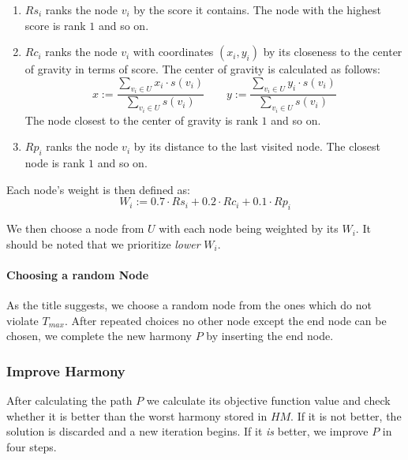 \begin{enumerate}
	\item $Rs_i$ ranks the node $v_i$ by the score it contains. The node with the highest score is rank $1$ and so on.
	\item $Rc_i$ ranks the node $v_i$ with coordinates $(x_i, y_i)$ by its closeness to the center of gravity in terms of score. The center of gravity is calculated as follows:
	      \begin{equation*}
		      x := \frac{\sum_{v_i \in U} x_i \cdot s(v_i)}{\sum_{v_i \in U} s(v_i)}\quad\quad
		      y := \frac{\sum_{v_i \in U} y_i \cdot s(v_i)}{\sum_{v_i \in U} s(v_i)}
	      \end{equation*}
	      The node closest to the center of gravity is rank $1$ and so on.
	\item $Rp_i$ ranks the node $v_i$ by its distance to the last visited node.
	      The closest node is rank $1$ and so on.
\end{enumerate}

Each node's weight is then defined as:
\begin{equation*}
  W_i := 0.7 \cdot Rs_i + 0.2 \cdot Rc_i + 0.1 \cdot Rp_i
\end{equation*}

We then choose a node from $U$ with each node being weighted by its $W_i$.
It should be noted that we prioritize \emph{lower} $W_i$.

\paragraph{Choosing a random Node}

As the title suggests, we choose a random node from the ones which do not violate $T_{max}$.
After repeated choices no other node except the end node can be chosen, we complete the new harmony $P$ by inserting the end node.

\subsubsection{Improve Harmony}
\label{subsubsec:04:createharmony}

After calculating the path $P$ we calculate its objective function value and check whether it is better than the worst harmony stored in $HM$.
If it is not better, the solution is discarded and a new iteration begins.
If it \emph{is} better, we improve $P$ in four steps.

